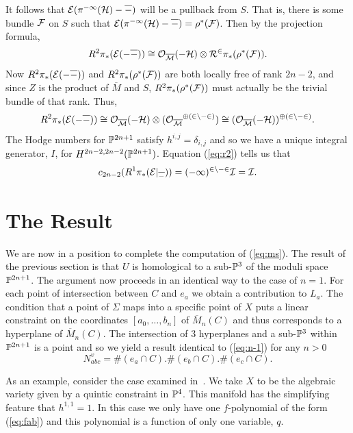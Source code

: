It follows that
 $\cal E(\pi^{-1}(H)-\overline\Gamma)$ will be a pullback from $S$.  That
is, there is some bundle $\cal F$ on $S$ such that
$\cal E(\pi^{-1}(H)-\overline\Gamma)=\rho^*(\cal F)$.  Then by the projection formula,
\begin{equation}
R^2\pi_*(\cal E(-\overline\Gamma))\cong
\cal O_{\overline M}(-H)\otimes R^2\pi_*(\rho^*(\cal F)).
\end{equation}
Now $R^2\pi_*(\cal E(-\overline\Gamma))$ and $R^2\pi_*(\rho^*(\cal F))$ are both
locally free of rank $2n-2$, and since $Z$ is the product of $\overline M$
and $S$, $R^2\pi_*(\rho^*(\cal F))$ must actually be the trivial bundle of
that rank.  Thus,
\begin{equation}
R^2\pi_*(\cal E(-\overline\Gamma))\cong
\cal O_{\overline M}(-H)\otimes ({\cal O_{\overline M}}^{\oplus (2n-2)})\cong
(\cal O_{\overline M}(-H))^{\oplus (2n-2)}. \label{eq:r2}
\end{equation}
The Hodge numbers for $\Bbb{P}^{2n+1}$ satisfy $h^{i,j}=\delta_{i,j}$ and
so we have a unique integral generator, $I$, for
$H^{2n-2,2n-2}(\Bbb{P}^{2n+1})$. Equation (\ref{eq:r2}) tells us that
\begin{equation}
  c_{2n-2}(R^1\pi_*(\cal E|_{\overline\Gamma}))=(-1)^{2n-2}I=I.
\end{equation}


\section{The Result}

We are now in a position to complete the computation of (\ref{eq:ms}).
The result of the previous section is that $U$ is homological to a
sub-$\Bbb{P}^{3}$ of the moduli space $\Bbb{P}^{2n+1}$. The argument now proceeds
in an identical way to the case of $n=1$. For each point of
intersection between $C$ and $e_a$ we obtain a contribution to $L_a$.
The condition that a point of $\Sigma$ maps into a specific point of
$X$ puts a linear constraint on the coordinates $[a_0,\ldots,b_n]$ of
$\overline M_n(C)$ and thus corresponds to a hyperplane of $\overline
M_n(C)$. The intersection of 3 hyperplanes and a sub-$\Bbb{P}^{3}$ within
$\Bbb{P}^{2n+1}$ is a point and so we yield a result identical to
(\ref{eq:n-1}) for any $n>0$
\begin{equation}
  N^{v}_{abc}=\#(e_a\cap C).\#(e_b\cap C).\#(e_c\cap C).
	\label{eq:n-n}
\end{equation}

As an example, consider the case examined in~\cite{Cand:rat}. We take
$X$ to be the algebraic variety given by a quintic constraint in
$\Bbb{P}^{4}$. This manifold has the simplifying feature that $h^{1,1}=1$. In
this case we only have one $f$-polynomial of the form (\ref{eq:fab})
and this polynomial is a function of only one variable, $q$.

